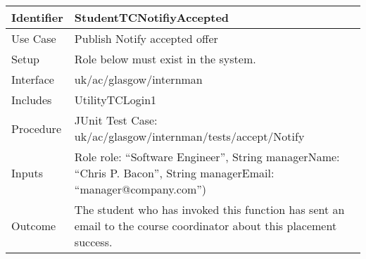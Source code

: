 \begin{tabularx}{\textwidth}{|T|L|}
\hline
Identifier & StudentTCNotifiyAccepted\\
\hline
Use Case & Publish Notify accepted offer\\
\hline
Setup & Role below must exist in the system.\\
\hline
Interface & uk/ac/glasgow/internman\\
\hline
Includes & UtilityTCLogin1\\
\hline
Procedure & JUnit Test Case: uk/ac/glasgow/internman/tests/accept/Notify\\
\hline
Inputs & Role role: ``Software Engineer'', String managerName: ``Chris
P. Bacon'', String managerEmail: ``manager@company.com'')\\
\hline
Outcome & The student who has invoked this function has sent an email
to the course coordinator about this placement success.\\
\hline
\end{tabularx}
